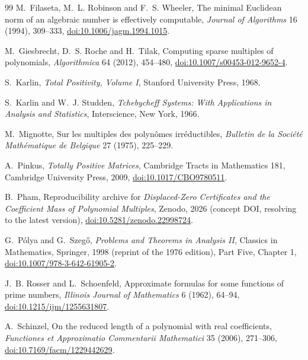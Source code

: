 \documentclass[11pt]{article}
\begin{document}
\begin{thebibliography}{99}
M.~Filaseta, M.~L. Robinson and F.~S. Wheeler,
\newblock The minimal Euclidean norm of an algebraic number is effectively
computable,
\newblock \emph{Journal of Algorithms} 16 (1994), 309--333,
\newblock \href{https://doi.org/10.1006/jagm.1994.1015}
{doi:10.1006/jagm.1994.1015}.

M.~Giesbrecht, D.~S. Roche and H.~Tilak,
\newblock Computing sparse multiples of polynomials,
\newblock \emph{Algorithmica} 64 (2012), 454--480,
\newblock \href{https://doi.org/10.1007/s00453-012-9652-4}
{doi:10.1007/s00453-012-9652-4}.

S.~Karlin,
\newblock \emph{Total Positivity, Volume I},
\newblock Stanford University Press, 1968.

S.~Karlin and W.~J. Studden,
\newblock \emph{Tchebycheff Systems: With Applications in Analysis and
Statistics},
\newblock Interscience, New York, 1966.

M.~Mignotte,
\newblock Sur les multiples des polyn\^omes irr\'eductibles,
\newblock \emph{Bulletin de la Soci\'et\'e Math\'ematique de Belgique} 27
(1975), 225--229.

A.~Pinkus,
\newblock \emph{Totally Positive Matrices},
\newblock Cambridge Tracts in Mathematics 181, Cambridge University Press,
2009,
\newblock \href{https://doi.org/10.1017/CBO9780511691713}
{doi:10.1017/\allowbreak CBO9780511}.

B.~Pham,
\newblock Reproducibility archive for \emph{Displaced-Zero Certificates and
the Coefficient Mass of Polynomial Multiples},
\newblock Zenodo, 2026 (concept DOI, resolving to the latest version),
\newblock \href{https://doi.org/10.5281/zenodo.22998724}
{doi:10.5281/zenodo.22998724}.

G.~P\'olya and G.~Szeg\H{o},
\newblock \emph{Problems and Theorems in Analysis II},
\newblock Classics in Mathematics, Springer, 1998 (reprint of the 1976
  edition), Part Five, Chapter 1,
\newblock \href{https://doi.org/10.1007/978-3-642-61905-2}
{doi:10.1007/978-3-642-61905-2}.

J.~B. Rosser and L.~Schoenfeld,
\newblock Approximate formulas for some functions of prime numbers,
\newblock \emph{Illinois Journal of Mathematics} 6 (1962), 64--94,
\newblock \href{https://doi.org/10.1215/ijm/1255631807}
{doi:10.1215/ijm/1255631807}.

A.~Schinzel,
\newblock On the reduced length of a polynomial with real coefficients,
\newblock \emph{Functiones et Approximatio Commentarii Mathematici} 35
(2006), 271--306,
\newblock \href{https://doi.org/10.7169/facm/1229442629}
{doi:10.7169/facm/1229442629}.


\end{thebibliography}
\end{document}
